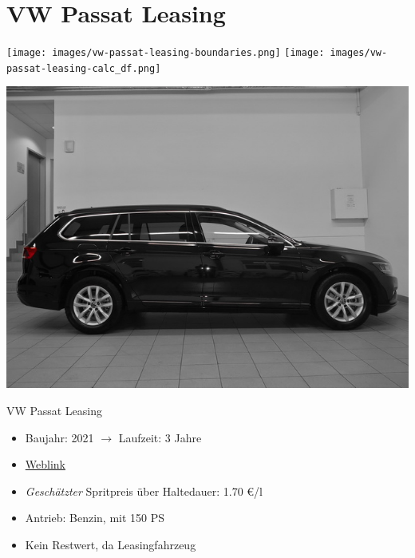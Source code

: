 \documentclass[landscape, DIV=99, 14pt]{scrartcl}
\begin{document}
\twocolumn

\section*{VW Passat Leasing}
\begin{center}
\texttt{[image: images/vw-passat-leasing-boundaries.png]}
\null
\vspace{0.5cm}
\texttt{[image: images/vw-passat-leasing-calc\_df.png]}
\end{center}

\pagebreak
\null
\vspace{2cm}
\begin{center}
\includegraphics[width=0.9\columnwidth]{cars/vw-passat-leasing.jpg}

VW Passat Leasing
\end{center}

\begin{itemize}
    \item Baujahr: 2021 $\rightarrow$ Laufzeit: 3 Jahre
    \item \href{https://www.autosuche.de/auto/REVVNDQ3NjgwMjc5NzI=?t_manuf=BQ&t_petr=B&t_model=BQBM&t_gear=A&t_ez_fr=2020&t_pe_fr=35000&sort=PRICE_SALE&sortdirection=ASC&viewMode=tile}{Weblink}
    \item \emph{Gesch\"atzter} Spritpreis \"uber Haltedauer: 1.70 \euro{}/l
    \item Antrieb: Benzin, mit 150 PS
    \item Kein Restwert, da Leasingfahrzeug
\end{itemize}

\pagebreak


\twocolumn
\end{document}
